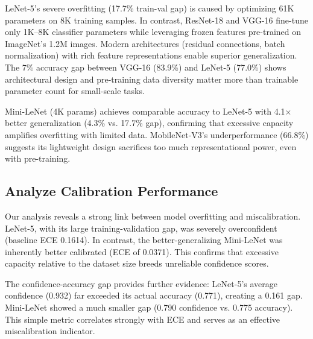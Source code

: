 \documentclass[10pt,twocolumn]{article}
\begin{document}
LeNet-5's severe overfitting (17.7\% train-val gap) is caused by optimizing 61K parameters on 8K training samples. In contrast, ResNet-18 and VGG-16 fine-tune only 1K--8K classifier parameters while leveraging frozen features pre-trained on ImageNet's 1.2M images. Modern architectures (residual connections, batch normalization) with rich feature representations enable superior generalization. The 7\% accuracy gap between VGG-16 (83.9\%) and LeNet-5 (77.0\%) shows architectural design and pre-training data diversity matter more than trainable parameter count for small-scale tasks.

Mini-LeNet (4K params) achieves comparable accuracy to LeNet-5 with 4.1$\times$ better generalization (4.3\% vs. 17.7\% gap), confirming that excessive capacity amplifies overfitting with limited data. MobileNet-V3's underperformance (66.8\%) suggests its lightweight design sacrifices too much representational power, even with pre-training.

\subsection{Analyze Calibration Performance}

Our analysis reveals a strong link between model overfitting and miscalibration. LeNet-5, with its large training-validation gap, was severely overconfident (baseline ECE 0.1614). In contrast, the better-generalizing Mini-LeNet was inherently better calibrated (ECE of 0.0371). This confirms that excessive capacity relative to the dataset size breeds unreliable confidence scores.

The confidence-accuracy gap provides further evidence: LeNet-5's average confidence (0.932) far exceeded its actual accuracy (0.771), creating a 0.161 gap. Mini-LeNet showed a much smaller gap (0.790 confidence vs. 0.775 accuracy). This simple metric correlates strongly with ECE and serves as an effective miscalibration indicator.
\end{document}
